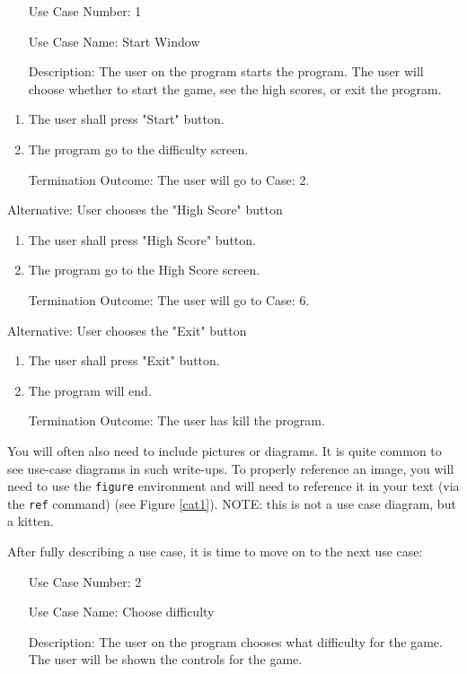 \documentclass[10pt,conference,onecolumn,compsoc]{IEEEtran}
\begin{document}
\begin{itemize}
\item[Use Case Number:] 1
\item[Use Case Name:] Start Window
\item[Description:] The user on the program starts the program. The user will choose whether to start the game, see the high scores, or exit the program.
\end{itemize}
\begin{enumerate}
\item The user shall press "Start" button.
\item The program go to the difficulty screen.
\item[Termination Outcome:] The user will go to Case: 2.
\end{enumerate}
Alternative: User chooses the "High Score" button
\begin{enumerate}
\item The user shall press "High Score" button.
\item The program go to the High Score screen.
\item[Termination Outcome:] The user will go to Case: 6.
\end{enumerate}
Alternative: User chooses the "Exit" button
\begin{enumerate}
\item The user shall press "Exit" button.
\item The program will end.
\item[Termination Outcome:] The user has kill the program.
\end{enumerate}

You will often also need to include pictures or diagrams.  It is quite common to see use-case diagrams in such write-ups.  To properly reference an image, you will need to use the \texttt{figure} environment and will need to reference it in your text (via the \texttt{ref} command) (see Figure \ref{cat1}).  NOTE: this is not a use case diagram, but a kitten.

After fully describing a use case, it is time to move on to the next use case:

\begin{itemize}
\item[Use Case Number:] 2
\item[Use Case Name:] Choose difficulty
\item[Description:] The user on the program chooses what difficulty for the game. The user will be shown the controls for the game.
\end{itemize}
\end{document}
